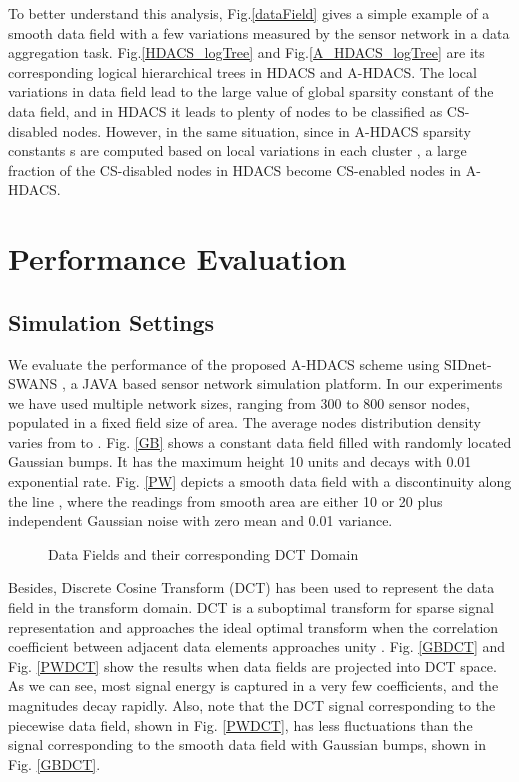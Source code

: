 \documentclass[conference]{IEEEtran}
\begin{document}
To better understand this analysis, Fig.\ref{dataField} gives a simple example of a smooth data field 
with a few variations measured by the sensor network in a data aggregation task.
Fig.\ref{HDACS_logTree} and Fig.\ref{A_HDACS_logTree} are its corresponding logical hierarchical trees 
in HDACS and A-HDACS. The local variations in data field lead to 
the large value of global sparsity constant  of the data field, and in HDACS it leads to plenty of nodes to be classified 
as CS-disabled 
nodes. However, in the same situation, since in A-HDACS sparsity constants s are computed based on local variations in each cluster ,
a large fraction of the CS-disabled nodes in HDACS become CS-enabled nodes in A-HDACS. 

\section{Performance Evaluation}
\subsection{Simulation Settings}
We evaluate the performance of the proposed A-HDACS scheme using SIDnet-SWANS \cite{SIDnet}, a JAVA based sensor network simulation platform. 
In our experiments we have used multiple network sizes, ranging from 300 to 800 sensor nodes, populated in a fixed field size of  area.
The average nodes distribution density varies from 
 to . Fig. \ref{GB} shows a constant data field filled 
with randomly located Gaussian bumps. It has the maximum height 10 units and decays with 0.01 exponential rate. 
Fig. \ref{PW} depicts a smooth data field with a discontinuity along the line 
, where the readings from smooth area are either 10 or 20 plus independent Gaussian noise 
with zero mean and 0.01 variance. 
\begin{figure*}
\centering
{}
\qquad
{}
\qquad
{}
\qquad
{}
\caption{Data Fields and their corresponding DCT Domain}
\end{figure*}

Besides, Discrete Cosine Transform (DCT) has been used to represent the data field in the transform domain.
DCT is a suboptimal transform for sparse signal representation and 
approaches the ideal optimal transform when the correlation coefficient between 
adjacent data elements approaches unity \cite{DCT_KL}. Fig. \ref{GBDCT} and Fig. \ref{PWDCT} show the results 
when data fields are projected into DCT space. As we can see, most signal energy is captured in a very 
few coefficients, and the magnitudes decay rapidly. Also, note that the DCT signal corresponding to the piecewise data field, 
shown in Fig. \ref{PWDCT}, has less fluctuations than the signal corresponding to the smooth data field with Gaussian bumps, 
shown in Fig. \ref{GBDCT}. 
\end{document}

